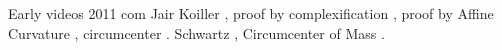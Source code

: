 Early videos 2011 com Jair Koiller \cite{dsr_vid11incenter,dsr_vid11e}, proof by complexification \cite{olga14}, proof by Affine Curvature \cite{garcia2019-incenter}, circumcenter \cite{corentin2021-circum}. Schwartz \cite{schwartz2016-com}, Circumcenter of Mass \cite{sergei2014-circumcenter-of-mass}.